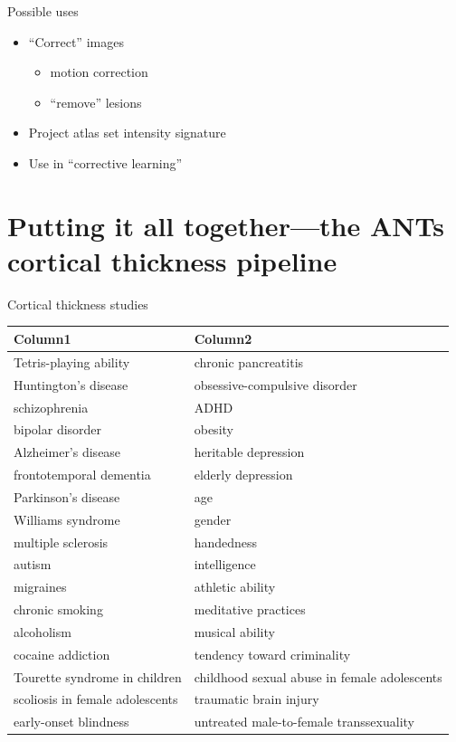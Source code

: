 \documentclass[ignorenonframetext,]{beamer}
\begin{document}
\begin{frame}{Possible uses}

\begin{itemize}
\item
  ``Correct'' images

  \begin{itemize}
  \item
    motion correction
  \item
    ``remove'' lesions
  \end{itemize}
\item
  Project atlas set intensity signature
\item
  Use in ``corrective learning''
\end{itemize}

\end{frame}

\section{Putting it all together---the ANTs cortical thickness
pipeline}\label{putting-it-all-togetherthe-ants-cortical-thickness-pipeline}

\begin{frame}{Cortical thickness studies}

\begin{longtable}[c]{@{}ll@{}}
\toprule
Column1 & Column2\tabularnewline
\midrule
\endhead
Tetris-playing ability & chronic pancreatitis\tabularnewline
Huntington's disease & obsessive-compulsive disorder\tabularnewline
schizophrenia & ADHD\tabularnewline
bipolar disorder & obesity\tabularnewline
Alzheimer's disease & heritable depression\tabularnewline
frontotemporal dementia & elderly depression\tabularnewline
Parkinson's disease & age\tabularnewline
Williams syndrome & gender\tabularnewline
multiple sclerosis & handedness\tabularnewline
autism & intelligence\tabularnewline
migraines & athletic ability\tabularnewline
chronic smoking & meditative practices\tabularnewline
alcoholism & musical ability\tabularnewline
cocaine addiction & tendency toward criminality\tabularnewline
Tourette syndrome in children & childhood sexual abuse in female
adolescents\tabularnewline
scoliosis in female adolescents & traumatic brain injury\tabularnewline
early-onset blindness & untreated male-to-female
transsexuality\tabularnewline
\bottomrule
\end{longtable}

\end{frame}
\end{document}
